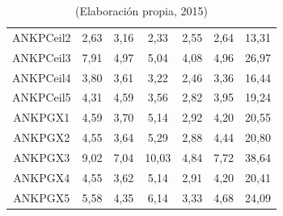 \begin{table}[hbtp!]
\begin{center}
\begin{tabular}{c|cccccc}
ANKPCeil2 & 2,63 & 3,16 & 2,33 & 2,55 & 2,64 & 13,31 \\
ANKPCeil3 & 7,91 & 4,97 & 5,04 & 4,08 & 4,96 & 26,97 \\
ANKPCeil4 & 3,80 & 3,61 & 3,22 & 2,46 & 3,36 & 16,44 \\
ANKPCeil5 & 4,31 & 4,59 & 3,56 & 2,82 & 3,95 & 19,24 \\
ANKPGX1 & 4,59 & 3,70 & 5,14 & 2,92 & 4,20 & 20,55 \\
ANKPGX2 & 4,55 & 3,64 & 5,29 & 2,88 & 4,44 & 20,80 \\
ANKPGX3 & 9,02 & 7,04 & 10,03 & 4,84 & 7,72 & 38,64 \\
ANKPGX4 & 4,55 & 3,62 & 5,14 & 2,91 & 4,20 & 20,41 \\
ANKPGX5 & 5,58 & 4,35 & 6,14 & 3,33 & 4,68 & 24,09 \\
\hline
\end{tabular}
\end{center}
\caption*{(Elaboración propia, 2015)}
\end{table}

